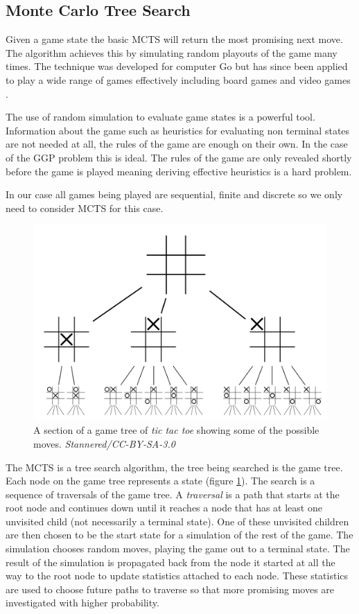 \subsection{Monte Carlo Tree Search}
Given a game state the basic MCTS will return the most promising next move. The algorithm achieves this by simulating random playouts of the game many times. The technique was developed for computer Go but has since been applied to play a wide range of games effectively including board games and video games \cite{Silver/MCTS,Chaslot/MCTS}.

The use of random simulation to evaluate game states is a powerful tool. Information about the game such as heuristics for evaluating non terminal states are not needed at all, the rules of the game are enough on their own. In the case of the GGP problem this is ideal. The rules of the game are only revealed shortly before the game is played meaning deriving effective heuristics is a hard problem.

In our case all games being played are sequential, finite and discrete so we only need to consider MCTS for this case.

\begin{figure}[ht]
	\centering
	\includegraphics[width=0.9\linewidth]{Tic-tac-toe-game-tree.png}
	\caption{A section of a game tree of \textit{tic tac toe} showing some of the possible moves. \textit{Stannered/CC-BY-SA-3.0}}
	\label{fig:game-tree}
\end{figure}

The MCTS is a tree search algorithm, the tree being searched is the game tree. Each node on the game tree represents a state (figure \ref{fig:game-tree}). The search is a sequence of traversals of the game tree. A \textit{traversal} is a path that starts at the root node and continues down until it reaches a node that has at least one unvisited child (not necessarily a terminal state). One of these unvisited children are then chosen to be the start state for a simulation of the rest of the game. The simulation chooses random moves, playing the game out to a terminal state. The result of the simulation is propagated back from the node it started at all the way to the root node to update statistics attached to each node. These statistics are used to choose future paths to traverse so that more promising moves are investigated with higher probability.

